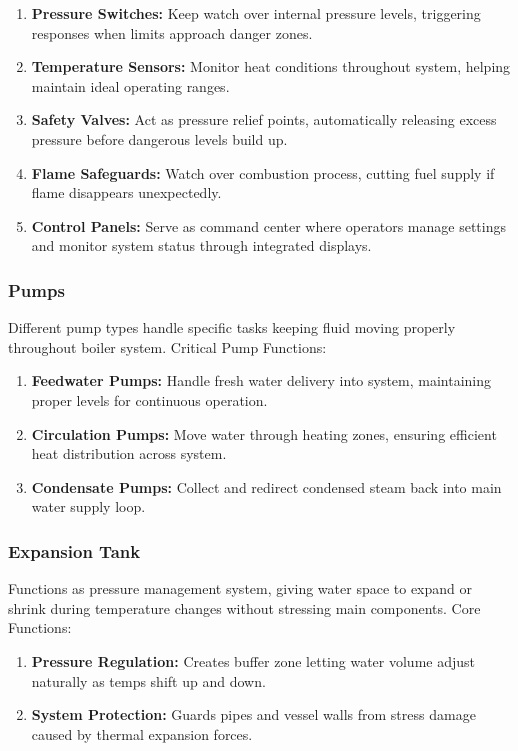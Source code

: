 \begin{enumerate}
    \item \textbf{Pressure Switches:} Keep watch over internal pressure levels, triggering responses when limits approach danger zones.
    \item \textbf{Temperature Sensors:} Monitor heat conditions throughout system, helping maintain ideal operating ranges.
    \item \textbf{Safety Valves:} Act as pressure relief points, automatically releasing excess pressure before dangerous levels build up.
    \item \textbf{Flame Safeguards:} Watch over combustion process, cutting fuel supply if flame disappears unexpectedly.
    \item \textbf{Control Panels:} Serve as command center where operators manage settings and monitor system status through integrated displays.
\end{enumerate}

\subsubsection{Pumps}
Different pump types handle specific tasks keeping fluid moving properly throughout boiler system.
Critical Pump Functions:
\begin{enumerate}
    \item \textbf{Feedwater Pumps:} Handle fresh water delivery into system, maintaining proper levels for continuous operation.
    \item \textbf{Circulation Pumps:} Move water through heating zones, ensuring efficient heat distribution across system.
    \item \textbf{Condensate Pumps:} Collect and redirect condensed steam back into main water supply loop.
\end{enumerate}

\subsubsection{Expansion Tank}
Functions as pressure management system, giving water space to expand or shrink during temperature changes without stressing main components.
Core Functions:
\begin{enumerate}
    \item \textbf{Pressure Regulation:} Creates buffer zone letting water volume adjust naturally as temps shift up and down.
    \item \textbf{System Protection:} Guards pipes and vessel walls from stress damage caused by thermal expansion forces.
\end{enumerate}

